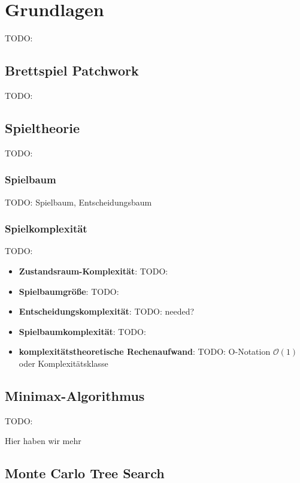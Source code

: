 \chapter{Grundlagen}
\label{chapter:grundlagen}

TODO:

\section{Brettspiel Patchwork}
\label{chapter:brettspiel-patchwork}

TODO:

\section{Spieltheorie}
\label{chapter:spieltheorie}

TODO:

\subsection{Spielbaum}

TODO: Spielbaum, Entscheidungsbaum

\subsection{Spielkomplexität}

TODO:

\begin{itemize}
    \item \textbf{Zustandsraum-Komplexität}: TODO:
    \item \textbf{Spielbaumgröße}: TODO:
    \item \textbf{Entscheidungskomplexität}: TODO: needed?
    \item \textbf{Spielbaumkomplexität}: TODO:
    \item \textbf{komplexitätstheoretische Rechenaufwand}: TODO: O-Notation $\mathcal{O}(1)$ oder Komplexitätsklasse
\end{itemize}

\section{Minimax-Algorithmus}
\label{chapter:minimax-algorithmus}

TODO:

Hier haben wir mehr

\section{Monte Carlo Tree Search}
\label{chapter:monte-carlo-tree-search}


